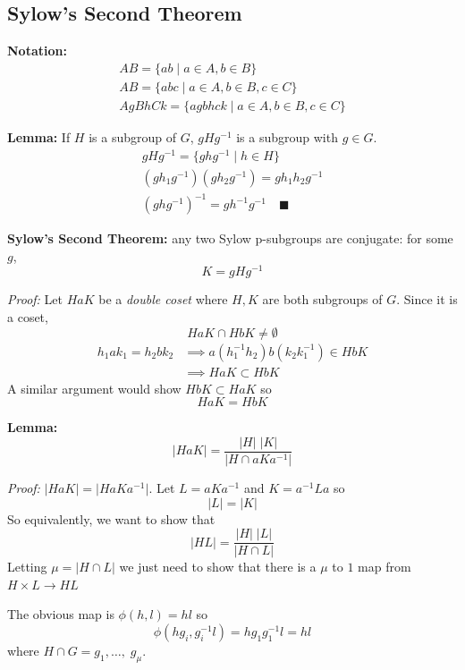 \documentclass[12pt]{report}
\newcommand{\qed}{\quad \blacksquare}
\renewcommand{\indent}{\hspace*{0.5in}}
\renewcommand{\v}{\big\vert}
\begin{document}
    \subsection*{Sylow's Second Theorem}
        \textbf{Notation:} 
        \begin{gather*}
            AB = \{ab \; | \; a\in A, b \in B\}\\
            AB = \{abc \; | \; a \in A, b \in B, c \in C\}\\
            AgBhCk = \{agbhck \; | \; a\in A, b \in B, c \in C\}
        \end{gather*}

        \textbf{Lemma:} If $H$ is a subgroup of $G$, $gHg^{-1}$ is a subgroup with $g \in G$.
            \begin{align*}
                gHg^{-1} = \{ghg^{-1} \; | \; h \in H\}\\
                (gh_1g^{-1})(gh_2g^{-1}) = gh_1h_2g^{-1}\\
                (ghg^{-1})^{-1} = gh^{-1}g^{-1} \qed
            \end{align*}

        \textbf{Sylow's Second Theorem:} any two Sylow p-subgroups are conjugate: for some $g$, 
        \[K = gHg^{-1}\]

        \emph{Proof:} Let $HaK$ be a \emph{double coset} where $H, K$ are both subgroups of $G$. Since it is a coset,
        \[HaK \cap HbK \neq \emptyset\]
        \begin{align*}
            h_1ak_1 = h_2bk_2 &\implies a (h_1^{-1}h_2)b(k_2k_1^{-1}) \in HbK\\
            &\implies HaK \subset HbK 
        \end{align*}
        A similar argument would show $HbK \subset HaK$ so 
        \[HaK = HbK\]

        \indent \textbf{Lemma:}
        \[\big\vert HaK \v = \frac{\v H \v \; \v K \v}{\v H \cap aKa^{-1}\v}\] 

        \indent \emph{Proof:} $\v HaK \v = \v HaKa^{-1}\v$. Let $L = aKa^{-1}$ and $K = a^{-1}La$ so
        \[\v L\v = \v K\v\] 
        So equivalently, we want to show that 
        \[\v HL \v = \frac{\v H \v \; \v L\v}{\v H \cap L\v}\]
        Letting $\mu = \v H \cap L\v$ we just need to show that there is a $\mu$ to $1$ map from $H \times L \to HL$ 

        The obvious map is $\phi(h, l) = hl$ so 
        \[\phi(hg_i, g_i^{-1}l) = hg_1g_1^{-1}l = hl\]
        where $H \cap G = g_1, \dots, \; g_\mu$. 
\end{document}
